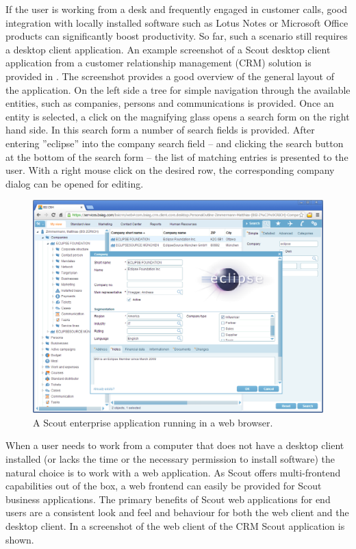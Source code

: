 \documentclass[a4paper,10pt,twoside]{book}
\begin{document}
If the user is working from a desk and frequently engaged in customer calls, good integration with locally installed software such as Lotus Notes or Microsoft Office products can significantly boost productivity.
So far, such a scenario still requires a desktop client application.
An example screenshot of a Scout desktop client application from a customer relationship management (CRM) solution is provided in .
The screenshot provides a good overview of the general layout of the application.
On the left side a tree for simple navigation through the available entities, such as companies, persons and communications is provided.
Once an entity is selected, a click on the magnifying glass opens a search form on the right hand side.
In this search form a number of search fields is provided.
After entering ''eclipse'' into the company search field -- and clicking the search button at the bottom of the search form -- the list of matching entries is presented to the user.
With a right mouse click on the desired row, the corresponding company dialog can be opened for editing.

\begin{figure}
\includegraphics[width=14cm]{bsi_crm_web.png}
\caption{A Scout enterprise application running in a web browser.}
\end{figure}

When a user needs to work from a computer that does not have a desktop client installed (or lacks the time or the necessary permission to install software) the natural choice is to work with a web application.
As Scout offers multi-frontend capabilities out of the box, a web frontend can easily be provided for Scout business applications.
The primary benefits of Scout web applications for end users are a consistent look and feel and behaviour for both the web client and the desktop client.
In  a screenshot of the web client of the CRM Scout application is shown.
\end{document}
